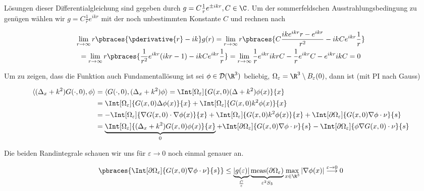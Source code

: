 \begin{solution}
\begin{enumerate}[label = (\roman*)]
Lösungen dieser Differentialgleichung sind gegeben durch $g = C \frac{1}{r}e^{\pm ikr}, C \in \C$. Um der sommerfeldschen Ausstrahlungsbedingung zu genügen
wählen wir $g = C \frac{1}{r}e^{ikr}$ mit der noch unbestimmten Konstante $C$ und rechnen nach

\begin{multline*}
  \lim_{r \to \infty} r \pbraces{\pderivative{r} - i k} g(r)
  =
  \lim_{r \to \infty} r \pbraces{C \frac{ik e^{ikr}r - e^{ikr}}{r^2} - ikC e^{ikr} \frac{1}{r}} \\
  =
  \lim_{r \to \infty} r \pbraces{\frac{1}{r^2} e^{ikr}(ikr - 1) - ikC e^{ikr} \frac{1}{r}}
  =
  \lim_{r \to \infty} \frac{1}{r} e^{ikr}ikr C - \frac{1}{r}e^{ikr}C - e^{ikr}ik C
  =
  0
\end{multline*}

Um zu zeigen, dass die Funktion auch Fundamentallösung ist sei $\phi \in \mathcal{D}(\R^3)$ beliebig, $\Omega_\varepsilon = \R^3 \setminus B_\varepsilon(0)$, dann ist (mit PI nach Gauss)

\begin{align*}
  \langle (\Delta_x + k^2)G(\cdot, 0), \phi \rangle
  &=
  \langle G(\cdot, 0), (\Delta_x + k^2) \phi \rangle
  =
  \Int[\Omega_\varepsilon]{G(x, 0) (\Delta + k^2) \phi(x)}{x} \\
  &=
  \Int[\Omega_\varepsilon]{G(x, 0) \Delta \phi(x)}{x} + \Int[\Omega_\varepsilon]{G(x, 0)k^2 \phi(x)}{x} \\
  &=
  -\Int[\Omega_\varepsilon]{\nabla G(x, 0) \cdot \nabla \phi(x)}{x}
    + \Int[\Omega_\varepsilon]{G(x, 0)k^2 \phi(x)}{x}
    + \Int[\partial \Omega_\varepsilon]{G(x,0) \nabla \phi \cdot \nu}{s} \\
  &=
  \underbrace{\Int[\Omega_\varepsilon]{(\Delta_x + k^2)G(x, 0) \phi(x)}{x}}_0
    + \Int[\partial \Omega_\varepsilon]{G(x,0) \nabla \phi \cdot \nu}{s}
    - \Int[\partial \Omega_\varepsilon]{\phi \nabla G(x,0) \cdot \nu}{s} \\
\end{align*}

Die beiden Randintegrale schauen wir uns für $\varepsilon \rightarrow 0$ noch einmal genauer an.

\begin{align*}
  \pbraces{\Int[\partial \Omega_\varepsilon]{G(x,0) \nabla \phi \cdot \nu}{s}}
  \leq
  \underbrace{|g(\varepsilon)|}_{\frac{C}{\varepsilon}} \underbrace{\text{meas}(\partial \Omega_\varepsilon)}_{\varepsilon^2 S_3} \max_{x \in \R^3}|\nabla \phi(x)|
  \stackrel{\varepsilon \to 0}{\longrightarrow}
  0
\end{align*}


\end{enumerate}
\end{solution}

